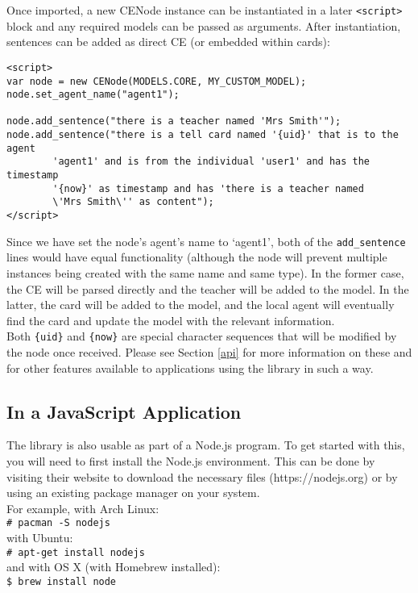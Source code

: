 \documentclass{scrartcl}
\begin{document}
Once imported, a new CENode instance can be instantiated in a later \texttt{<script>} block and any required models can be passed as arguments. After instantiation, sentences can be added as direct CE (or embedded within cards):
\begin{verbatim}
<script>
var node = new CENode(MODELS.CORE, MY_CUSTOM_MODEL);
node.set_agent_name("agent1");

node.add_sentence("there is a teacher named 'Mrs Smith'");
node.add_sentence("there is a tell card named '{uid}' that is to the agent 
        'agent1' and is from the individual 'user1' and has the timestamp 
        '{now}' as timestamp and has 'there is a teacher named 
        \'Mrs Smith\'' as content");
</script>
\end{verbatim}

Since we have set the node's agent's name to `agent1', both of the \texttt{add\_sentence} lines would have equal functionality (although the node will prevent multiple instances being created with the same name and same type). In the former case, the CE will be parsed directly and the teacher will be added to the model. In the latter, the card will be added to the model, and the local agent will eventually find the card and update the model with the relevant information.\\

Both \texttt{\{uid\}} and \texttt{\{now\}} are special character sequences that will be modified by the node once received. Please see Section \ref{api} for more information on these and for other features available to applications using the library in such a way.

\subsection{In a JavaScript Application}
\label{as_an_app}
The library is also usable as part of a Node.js program. To get started with this, you will need to first install the Node.js environment. This can be done by visiting their website to download the necessary files (https://nodejs.org) or by using an existing package manager on your system.\\
For example, with Arch Linux:\\
\texttt{\# pacman -S nodejs}\\
with Ubuntu:\\
\texttt{\# apt-get install nodejs}\\
and with OS X (with Homebrew installed):\\
\texttt{\$ brew install node}\\
\end{document}
